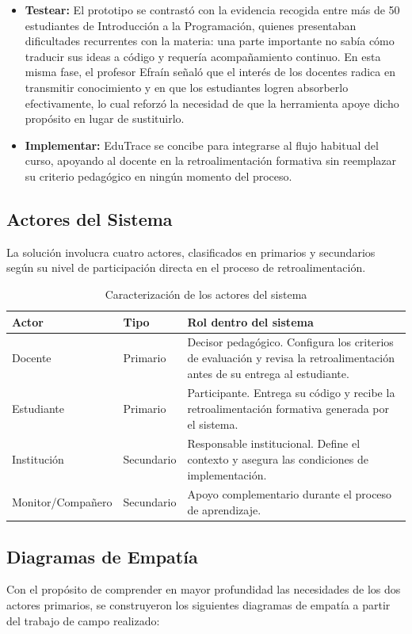 \documentclass[letterpaper, 10 pt, conference]{ieeeconf}
\begin{document}
\begin{itemize}
	\item \textbf{Testear:} El prototipo se contrastó con la evidencia recogida entre más de 50 estudiantes de Introducción a la Programación, quienes presentaban dificultades recurrentes con la materia: una parte importante no sabía cómo traducir sus ideas a código y requería acompañamiento continuo. En esta misma fase, el profesor Efraín señaló que el interés de los docentes radica en transmitir conocimiento y en que los estudiantes logren absorberlo efectivamente, lo cual reforzó la necesidad de que la herramienta apoye dicho propósito en lugar de sustituirlo.
	\item \textbf{Implementar:} EduTrace se concibe para integrarse al flujo habitual del curso, apoyando al docente en la retroalimentación formativa sin reemplazar su criterio pedagógico en ningún momento del proceso.
\end{itemize}

\subsection{Actores del Sistema}
La solución involucra cuatro actores, clasificados en primarios y secundarios según su nivel de participación directa en el proceso de retroalimentación.

\begin{table}[ht]
	\centering
	\caption{Caracterización de los actores del sistema}
	\label{tab:actores}
	\begin{tabular}{llp{3.7cm}}
		\hline
		\textbf{Actor} & \textbf{Tipo} & \textbf{Rol dentro del sistema} \\
		\hline
		Docente & Primario & Decisor pedagógico. Configura los criterios de evaluación y revisa la retroalimentación antes de su entrega al estudiante. \\
		Estudiante & Primario & Participante. Entrega su código y recibe la retroalimentación formativa generada por el sistema. \\
		Institución & Secundario & Responsable institucional. Define el contexto y asegura las condiciones de implementación. \\
		Monitor/Compañero & Secundario & Apoyo complementario durante el proceso de aprendizaje. \\
		\hline
	\end{tabular}
\end{table}

\subsection{Diagramas de Empatía}
Con el propósito de comprender en mayor profundidad las necesidades de los dos actores primarios, se construyeron los siguientes diagramas de empatía a partir del trabajo de campo realizado:
\end{document}
